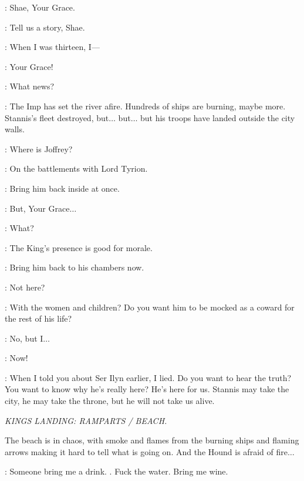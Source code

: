 \SHAE: Shae, Your Grace. 

\CERSEI: Tell us a story, Shae. 


\SHAE: When I was thirteen, I--- 


\LANCEL: Your Grace! 

\CERSEI: What news? 

\LANCEL: The Imp has set the river afire. Hundreds of ships are burning, maybe more. Stannis's fleet destroyed, but$\ldots$ but$\ldots$ but his troops have landed outside the city walls. 

\CERSEI: Where is Joffrey? 

\LANCEL: On the battlements with Lord Tyrion. 

\CERSEI: Bring him back inside at once. 

\LANCEL: But, Your Grace$\ldots$  

\CERSEI: What? 

\LANCEL: The King's presence is good for morale. 

\CERSEI: Bring him back to his chambers now. 

\LANCEL: Not here? 

\CERSEI: With the women and children? Do you want him to be mocked as a coward for the rest of his life? 

\LANCEL: No, but I$\ldots$  

\CERSEI: Now! 


\CERSEI: When I told you about Ser Ilyn earlier, I lied. Do you want to hear the truth? You want to know why he's really here? He's here for us. Stannis may take the city, he may take the throne, but he will not take us alive. 


\scene

\textit{KINGS LANDING: RAMPARTS / BEACH.}


\n The beach is in chaos, with smoke and flames from the burning ships and flaming arrows making it hard to tell what is going on. And the Hound is afraid of fire$\ldots$


\HOUND: Someone bring me a drink. . Fuck the water.  Bring me wine. 

